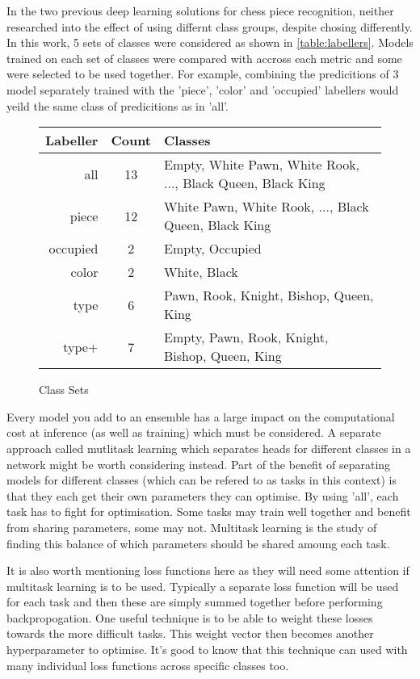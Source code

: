In the two previous deep learning solutions for chess piece recognition, neither researched into the effect of using differnt class groups, 
despite chosing differently.
In this work, 5 sets of classes were considered as shown in \autoref{table:labellers}.  Models trained on each set of classes were compared
with accross each metric and some were selected to be used together.  For example, combining the predicitions of 3 model separately trained with
the 'piece', 'color' and 'occupied' labellers would yeild the same class of predicitions as in 'all'.
\begin{center}
\begin{figure}
\begin{tabular}{|r|c|l|}
    \hline
    Labeller & Count & Classes \\
    \hline
    all & 13 & Empty, White Pawn, White Rook, ..., Black Queen, Black King \\
    piece & 12 & White Pawn, White Rook, ..., Black Queen, Black King \\
    occupied & 2 & Empty, Occupied \\
    color & 2 & White, Black \\
    type & 6 & Pawn, Rook, Knight, Bishop, Queen, King \\
    type+ & 7 & Empty, Pawn, Rook, Knight, Bishop, Queen, King \\
    \hline
\end{tabular}
\caption{Class Sets}
\label{table:labellers}
\end{figure}
\end{center}

Every model you add to an ensemble has a large impact on the computational cost at inference (as well as training) which must be considered.  A separate
approach called mutlitask learning which separates heads for different classes in a network might be worth considering instead.  
Part of the benefit of separating models for different classes (which can be 
refered to as tasks in this context) is that they each get their own parameters they can optimise.  By using 'all', each task has to fight for optimisation.
Some tasks may train well together and benefit from sharing parameters, some may not.  Multitask learning is the study of finding this balance of which 
parameters should be shared amoung each task.

It is also worth mentioning loss functions here as they will need some attention if multitask learning is to be used.  Typically a separate loss function will be 
used for each task and then these are simply summed together before performing backpropogation.  One useful technique is to be able to weight these losses towards 
the more difficult tasks.  This weight vector then becomes another hyperparameter to optimise.  It's good to know that this technique can used with many 
individual loss functions across specific classes too.

